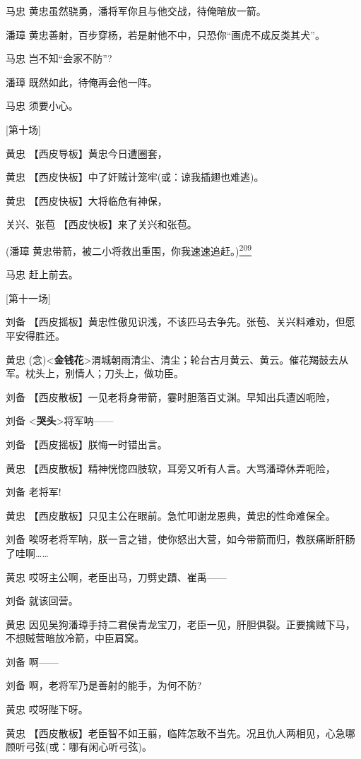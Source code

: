 马忠 黄忠虽然骁勇，潘将军你且与他交战，待俺暗放一箭。

潘璋 黄忠善射，百步穿杨，若是射他不中，只恐你``画虎不成反类其犬''。

马忠 岂不知``会家不防''?

潘璋 既然如此，待俺再会他一阵。

马忠 须要小心。

{[}第十场{]}

黄忠 【西皮导板】黄忠今日遭圈套，

黄忠 【西皮快板】中了奸贼计笼牢(或：谅我插翅也难逃)。

黄忠 【西皮快板】大将临危有神保，

关兴、张苞 【西皮快板】来了关兴和张苞。

(潘璋
黄忠带箭，被二小将救出重围，你我速速追赶。)\protect\hyperlink{fn209}{\textsuperscript{209}}

马忠 赶上前去。

{[}第十一场{]}

刘备
【西皮摇板】黄忠性傲见识浅，不该匹马去争先。张苞、关兴料难劝，但愿平安得胜还。

黄忠
(念)\textless{}\textbf{金钱花}\textgreater{}渭城朝雨清尘、清尘；轮台古月黄云、黄云。催花羯鼓去从军。枕头上，别情人；刀头上，做功臣。

刘备 【西皮散板】一见老将身带箭，霎时胆落百丈渊。早知出兵遭凶呃险，

刘备 \textless{}\textbf{哭头}\textgreater{}将军呐------

刘备 【西皮摇板】朕悔一时错出言。

黄忠 【西皮散板】精神恍惚四肢软，耳旁又听有人言。大骂潘璋休弄呃险，

刘备 老将军!

黄忠 【西皮散板】只见主公在眼前。急忙叩谢龙恩典，黄忠的性命难保全。

刘备
唉呀老将军呐，朕一言之错，使你怒出大营，如今带箭而归，教朕痛断肝肠了哇啊\ldots{}\ldots{}

黄忠 哎呀主公啊，老臣出马，刀劈史蹟、崔禹------

刘备 就该回营。

黄忠
因见吴狗潘璋手持二君侯青龙宝刀，老臣一见，肝胆俱裂。正要擒贼下马，不想贼营暗放冷箭，中臣肩窝。

刘备 啊------

刘备 啊，老将军乃是善射的能手，为何不防?

黄忠 哎呀陛下呀。

黄忠
【西皮散板】老臣智不如王翦，临阵怎敢不当先。况且仇人两相见，心急哪顾听弓弦(或：哪有闲心听弓弦)。


